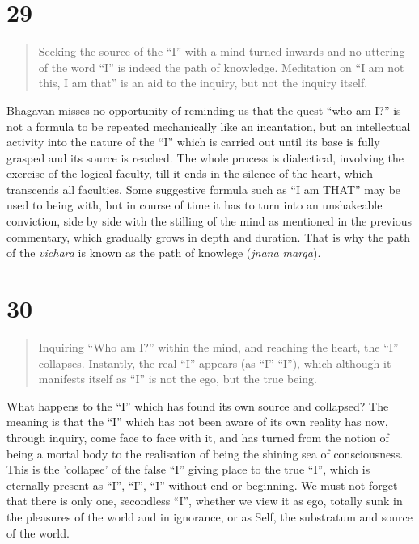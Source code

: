 \documentclass[12pt]{report}
\begin{document}
{\index{}

\section*{29}

\begin{quote}
  Seeking the source of the ``I'' with a mind turned inwards and no
  uttering of the word ``I'' is indeed the path of
  knowledge. Meditation on ``I am not this, I am that'' is an aid to
  the inquiry, but not the inquiry itself.
\end{quote}


Bhagavan misses no opportunity of reminding us that the quest ``who am
I?'' is not a formula to be repeated mechanically like an incantation,
but an intellectual activity into the nature of the ``I'' which is
carried out until its base is fully grasped and its source is
reached. The whole process is dialectical, involving the exercise of
the logical faculty, till it ends in the silence of the heart, which
transcends all faculties. Some suggestive formula such as ``I am
THAT'' may be used to being with, but in course of time it has to turn
into an unshakeable conviction, side by side with the stilling of the
mind as mentioned in the previous commentary, which gradually grows in
depth and duration. That is why the path of the \emph{vichara} is
known as the path of knowlege (\emph{jnana marga}).

\section*{30}

\begin{quote}
  Inquiring ``Who am I?'' within the mind, and reaching the heart, the
  ``I'' collapses. Instantly, the real ``I'' appears (as ``I'' ``I''),
  which although it manifests itself as ``I'' is not the ego, but the
  true being.
\end{quote}


What happens to the ``I'' which has found its own source and
collapsed? The meaning is that the ``I'' which has not been aware of
its own reality has now, through inquiry, come face to face with it,
and has turned from the notion of being a mortal body to the
realisation of being the shining sea of consciousness. This is the
'collapse' of the false ``I'' giving place to the true ``I'', which is
eternally present as ``I'', ``I'', ``I'' without end or beginning. We
must not forget that there is only one, secondless ``I'', whether we
view it as ego, totally sunk in the pleasures of the world and in
ignorance, or as Self, the substratum and source of the world.

}
\end{document}
